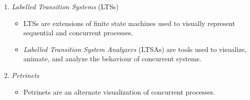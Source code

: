 \documentclass{article}
\begin{document}
\begin{itemize}
\begin{enumerate}
\begin{itemize}
			\item Finite State Processes are an algebraic description of sequential and concurrent processes.
			\item Also called \emph{process algebras}.
		\end{itemize}
		\item \emph{Labelled Transition Systems} (LTSs)
		\begin{itemize}
			\item LTSs are extensions of finite state machines used to visually represent sequential and concurrent processes.
			\item \emph{Labelled Transition System Analyzers} (LTSAs) are tools used to visualize, animate, and analyze the behaviour of concurrent systems.
		\end{itemize}
		\item \emph{Petrinets}
		\begin{itemize}
			\item Petrinets are an alternate visualization of concurrent processes.
		\end{itemize}
	\end{enumerate}
\end{itemize}

\ifdefined\iscombined
\newpage
\else
  
\end{document}
